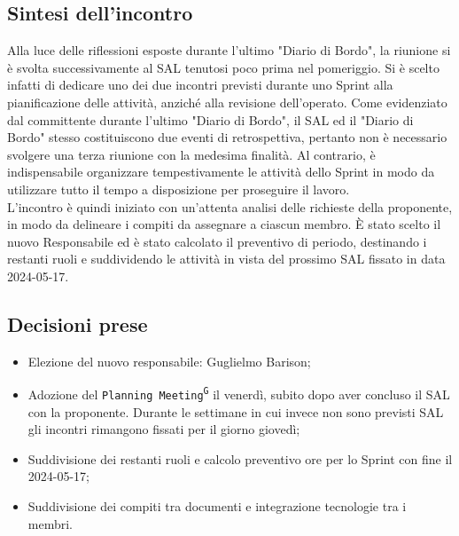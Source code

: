 \documentclass[8pt]{article}
\newcommand{\glossterm}[1]{#1\textsuperscript{G}} %
\begin{document}
\subsection{Sintesi dell'incontro}
Alla luce delle riflessioni esposte durante l'ultimo "Diario di Bordo", la riunione si è svolta successivamente al SAL tenutosi poco prima nel pomeriggio. Si è scelto infatti di dedicare uno dei due incontri previsti durante uno Sprint alla pianificazione delle attività, anziché alla revisione dell'operato. Come evidenziato dal committente durante l'ultimo "Diario di Bordo", il SAL ed il "Diario di Bordo" stesso costituiscono due eventi di retrospettiva, pertanto non è necessario svolgere una terza riunione con la medesima finalità. Al contrario, è indispensabile organizzare tempestivamente le attività dello Sprint in modo da utilizzare tutto il tempo a disposizione per proseguire il lavoro. \\
L'incontro è quindi iniziato con un'attenta analisi delle richieste della proponente, in modo da delineare i compiti da assegnare a ciascun membro. È stato scelto il nuovo Responsabile ed è stato calcolato il preventivo di periodo, destinando i restanti ruoli e suddividendo le attività in vista del prossimo SAL fissato in data 2024-05-17.

\subsection{Decisioni prese}
\begin{itemize}
	\setlength\itemsep{0em}
	\item Elezione del nuovo responsabile: Guglielmo Barison;
        \item Adozione del \texttt{\glossterm{Planning Meeting}} il venerdì, subito dopo aver concluso il SAL con la proponente. Durante le settimane in cui invece non sono previsti SAL gli incontri rimangono fissati per il giorno giovedì;
	\item Suddivisione dei restanti ruoli e calcolo preventivo ore per lo Sprint con fine il 2024-05-17;
	\item Suddivisione dei compiti tra documenti e integrazione tecnologie tra i membri.
\end{itemize}
\newpage
\end{document}

